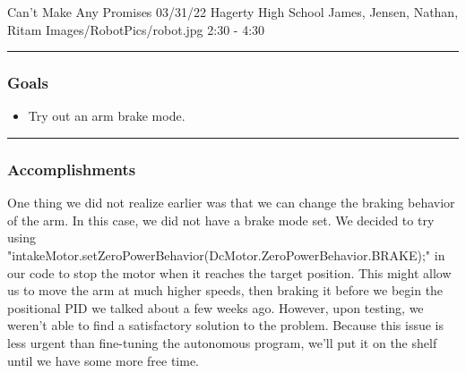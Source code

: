 \insertmeeting 
	{Can't Make Any Promises} 
	{03/31/22} 
	{Hagerty High School}
	{James, Jensen, Nathan, Ritam}
	{Images/RobotPics/robot.jpg}
	{2:30 - 4:30}
	
\noindent\hfil\rule{\textwidth}{.4pt}\hfil
\subsubsection*{Goals}
\begin{itemize}
    \item Try out an arm brake mode.

\end{itemize} 

\noindent\hfil\rule{\textwidth}{.4pt}\hfil

\subsubsection*{Accomplishments}
One thing we did not realize earlier was that we can change the braking behavior of the arm. In this case, we did not have a brake mode set. We decided to try using "intakeMotor.setZeroPowerBehavior(DcMotor.ZeroPowerBehavior.BRAKE);" in our code to stop the motor when it reaches the target position. This might allow us to move the arm at much higher speeds, then braking it before we begin the positional PID we talked about a few weeks ago. However, upon testing, we weren't able to find a satisfactory solution to the problem. Because this issue is less urgent than fine-tuning the autonomous program, we'll put it on the shelf until we have some more free time. 





